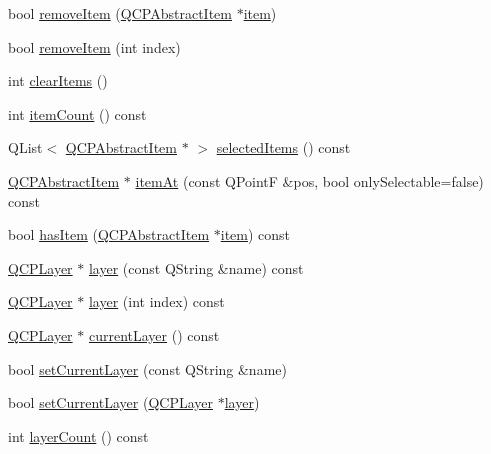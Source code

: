 \begin{DoxyCompactItemize}
\item 
bool \hyperlink{class_q_custom_plot_ae04446557292551e8fb6e2c106e1848d}{remove\+Item} (\hyperlink{class_q_c_p_abstract_item}{Q\+C\+P\+Abstract\+Item} $\ast$\hyperlink{class_q_custom_plot_a3e842b5a65b1d17fbb96cfb1fa1314d1}{item})
\item 
bool \hyperlink{class_q_custom_plot_abcfdda3d601c0441cab136137d715dea}{remove\+Item} (int index)
\item 
int \hyperlink{class_q_custom_plot_abdfd07d4f0591d0cf967f85013fd3645}{clear\+Items} ()
\item 
int \hyperlink{class_q_custom_plot_a6fc860e30df17fd5c46056bf6fe29390}{item\+Count} () const 
\item 
Q\+List$<$ \hyperlink{class_q_c_p_abstract_item}{Q\+C\+P\+Abstract\+Item} $\ast$ $>$ \hyperlink{class_q_custom_plot_a1a48b13547e2d9ac5cd6927516f47a2e}{selected\+Items} () const 
\item 
\hyperlink{class_q_c_p_abstract_item}{Q\+C\+P\+Abstract\+Item} $\ast$ \hyperlink{class_q_custom_plot_a793e4b04e0ede11a733021907368fa83}{item\+At} (const Q\+PointF \&pos, bool only\+Selectable=false) const 
\item 
bool \hyperlink{class_q_custom_plot_ab4199c38b03e63a2623c82453fe8add5}{has\+Item} (\hyperlink{class_q_c_p_abstract_item}{Q\+C\+P\+Abstract\+Item} $\ast$\hyperlink{class_q_custom_plot_a3e842b5a65b1d17fbb96cfb1fa1314d1}{item}) const 
\item 
\hyperlink{class_q_c_p_layer}{Q\+C\+P\+Layer} $\ast$ \hyperlink{class_q_custom_plot_aac492da01782820454e9136a8db28182}{layer} (const Q\+String \&name) const 
\item 
\hyperlink{class_q_c_p_layer}{Q\+C\+P\+Layer} $\ast$ \hyperlink{class_q_custom_plot_a1e73051e371f1815b48d8b355be0d2ab}{layer} (int index) const 
\item 
\hyperlink{class_q_c_p_layer}{Q\+C\+P\+Layer} $\ast$ \hyperlink{class_q_custom_plot_af73057345656cbd1463454982d808b00}{current\+Layer} () const 
\item 
bool \hyperlink{class_q_custom_plot_a73a6dc47c653bb6f8f030abca5a11852}{set\+Current\+Layer} (const Q\+String \&name)
\item 
bool \hyperlink{class_q_custom_plot_a23a4d3cadad1a0063c5fe19aac5659e6}{set\+Current\+Layer} (\hyperlink{class_q_c_p_layer}{Q\+C\+P\+Layer} $\ast$\hyperlink{class_q_custom_plot_aac492da01782820454e9136a8db28182}{layer})
\item 
int \hyperlink{class_q_custom_plot_a1b3926884f5bd4bdda1495d8b3c891d0}{layer\+Count} () const 

\end{DoxyCompactItemize}
